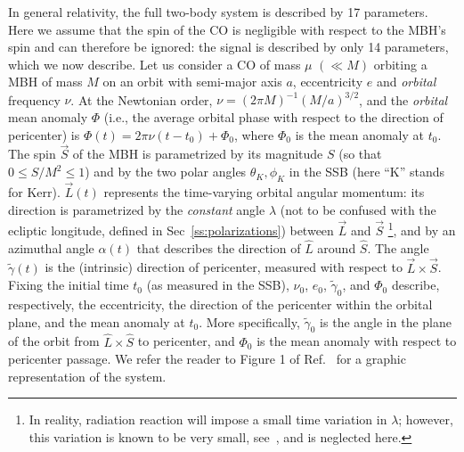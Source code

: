\documentclass[12pt]{iopart}
\begin{document}
In general relativity, the full two-body system is described by 17 parameters. Here we assume that the spin of the CO is negligible with respect to the MBH's spin and can therefore be ignored: the signal is described by only 14 parameters, which we now describe. Let us consider a CO of mass $\mu$ $(\ll M)$ orbiting a MBH of mass $M$ on an orbit with semi-major axis $a$, eccentricity $e$ and \emph{orbital} frequency $\nu$. At the Newtonian order,  $\nu = (2\pi M)^{-1} (M/a)^{3/2}$, and the \emph{orbital} mean anomaly $\Phi$ (i.e., the average orbital phase with respect to the direction of pericenter) is $\Phi(t) = 2\pi\nu (t-t_0) +\Phi_0$, where  $\Phi_0$ is the mean anomaly at $t_0$. The spin $\vec S$ of the MBH is parametrized by its magnitude $S$ (so that $0 \le S/M^2 \le 1$) and by the two polar angles $\theta_K,\phi_K$ in the SSB (here ``K'' stands for Kerr). $\vec L(t)$ represents the time-varying orbital angular momentum: its direction is parametrized by the \emph{constant} angle $\lambda$ (not to be confused with the ecliptic longitude, defined in Sec~\ref{ss:polarizations}) between $\vec L$ and $\vec S$%
\footnote{In reality, radiation reaction will impose a small time variation in $\lambda$; however, this variation is known to be very small, see~\cite{scott1}, and is neglected here.}, and by an azimuthal angle $\alpha(t)$ that describes the direction of $\hat L$ around $\hat S$. The angle $\tilde\gamma(t)$ is the (intrinsic) direction of pericenter, measured with respect to $\vec L\times\vec S$. Fixing the initial time $t_0$ (as measured in the SSB), $\nu_0$, $e_0$, $\tilde\gamma_0$, and $\Phi_0$ describe, respectively, the eccentricity, the direction of the pericenter within the orbital plane, and the mean anomaly at $t_0$. More specifically, $\tilde\gamma_0$ is the angle in the plane of the orbit from $\hat L \times \hat S$ to pericenter, and $\Phi_0$ is the mean anomaly with respect to pericenter passage. We refer the reader to Figure 1 of Ref.~\cite{BC} for a graphic representation of the system.
\end{document}
